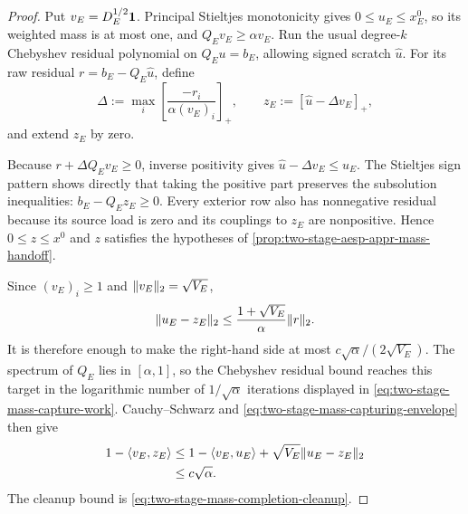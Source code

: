 \begin{proof}
Put $v_E=D_E^{1/2}\mathbf{1}$.  Principal Stieltjes monotonicity gives
$0\leq u_E\leq x_E^0$, so its weighted mass is at most one, and
$Q_Ev_E\geq\alpha v_E$.  Run the usual degree-$k$ Chebyshev residual
polynomial on $Q_Eu=b_E$, allowing signed scratch $\widehat u$.  For its raw
residual $r=b_E-Q_E\widehat u$, define
\begin{equation*}
 \Delta:=\max_i\left[\frac{-r_i}{\alpha(v_E)_i}\right]_+,
 \qquad z_E:=[\widehat u-\Delta v_E]_+,
\end{equation*}
and extend $z_E$ by zero.

Because $r+\Delta Q_Ev_E\geq0$, inverse positivity gives
$\widehat u-\Delta v_E\leq u_E$.  The Stieltjes sign pattern shows directly
that taking the positive part preserves the subsolution inequalities:
$b_E-Q_Ez_E\geq0$.  Every exterior row also has nonnegative residual because
its source load is zero and its couplings to $z_E$ are nonpositive.  Hence
$0\leq z\leq x^0$ and $z$ satisfies the hypotheses of
\cref{prop:two-stage-aesp-appr-mass-handoff}.

Since $(v_E)_i\geq1$ and $\lVert v_E\rVert_2=\sqrt{V_E}$,
\begin{equation*}
 \lVert u_E-z_E\rVert_2
 \leq\frac{1+\sqrt{V_E}}{\alpha}\lVert r\rVert_2.
\end{equation*}
It is therefore enough to make the right-hand side at most
$c\sqrt\alpha/(2\sqrt{V_E})$.  The spectrum of $Q_E$ lies in $[\alpha,1]$,
so the Chebyshev residual bound reaches this target in the logarithmic number
of $1/\sqrt\alpha$ iterations displayed in
\cref{eq:two-stage-mass-capture-work}.  Cauchy--Schwarz and
\cref{eq:two-stage-mass-capturing-envelope} then give
\begin{align*}
 1-\langle v_E,z_E\rangle
 &\leq 1-\langle v_E,u_E\rangle
      +\sqrt{V_E}\lVert u_E-z_E\rVert_2\\
 &\leq c\sqrt\alpha.
\end{align*}
The cleanup bound is
\cref{eq:two-stage-mass-completion-cleanup}.
\end{proof}

